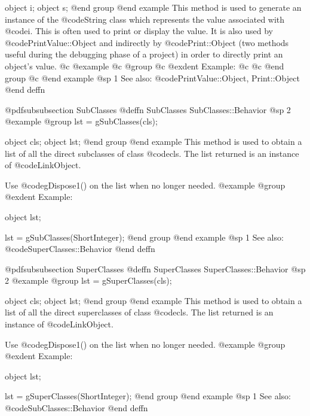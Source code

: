 object  i;
object  s;
@end group
@end example
This method is used to generate an instance of the @code{String} class
which represents the value associated with @code{i}.  This is often
used to print or display the value.  It is also used by
@code{PrintValue::Object} and indirectly by @code{Print::Object}
(two methods useful during the debugging phase of a project)
in order to directly print an object's value.
@c @example
@c @group
@c @exdent Example:
@c 
@c @end group
@c @end example
@sp 1
See also:  @code{PrintValue::Object, Print::Object}
@end deffn










@pdfsubsubsection {SubClasses}
@deffn {SubClasses} SubClasses::Behavior
@sp 2
@example
@group
lst = gSubClasses(cls);

object  cls;
object  lst;
@end group
@end example
This method is used to obtain a list of all the direct subclasses of
class @code{cls}.  The list returned is an instance of
@code{LinkObject}.

Use @code{gDispose1()} on the list when no longer needed.
@example
@group
@exdent Example:

object  lst;

lst = gSubClasses(ShortInteger);
@end group
@end example
@sp 1
See also:  @code{SuperClasses::Behavior}
@end deffn









@pdfsubsubsection {SuperClasses}
@deffn {SuperClasses} SuperClasses::Behavior
@sp 2
@example
@group
lst = gSuperClasses(cls);

object  cls;
object  lst;
@end group
@end example
This method is used to obtain a list of all the direct superclasses of
class @code{cls}.  The list returned is an instance of
@code{LinkObject}.

Use @code{gDispose1()} on the list when no longer needed.
@example
@group
@exdent Example:

object  lst;

lst = gSuperClasses(ShortInteger);
@end group
@end example
@sp 1
See also:  @code{SubClasses::Behavior}
@end deffn











